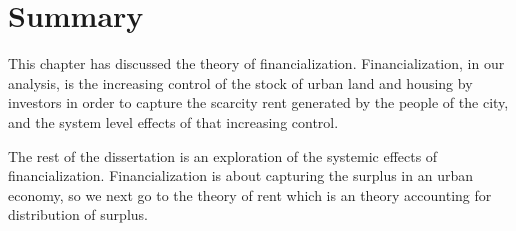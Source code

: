 \section{Summary} %

This chapter has discussed the theory of financialization.
Financialization, in our analysis, is the increasing control of the stock of urban land and housing by investors in order to capture the scarcity rent generated by the people of the city, and the system level effects of that increasing control.  

The rest of the dissertation is an exploration of the systemic effects of financialization. 
Financialization is about capturing the surplus in an urban economy, so we next go to the theory of rent which is an theory accounting for distribution of surplus. 